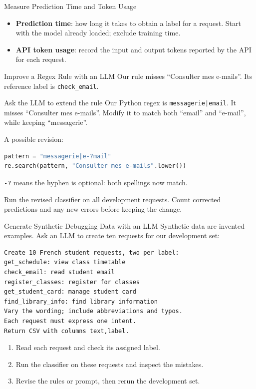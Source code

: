 \documentclass[aspectratio=169]{beamer}
\begin{document}
\begin{frame}{Measure Prediction Time and Token Usage}
  \begin{itemize}
    \item \textbf{Prediction time}: how long it takes to obtain a label for a request. Start with the model already loaded; exclude training time.
    \item \textbf{API token usage}: record the input and output tokens reported by the API for each request.
  \end{itemize}
\end{frame}

\begin{frame}[fragile]{Improve a Regex Rule with an LLM}
  \small Our rule misses ``Consulter mes e-mails''. Its reference label is \texttt{check\_email}.
  \begin{block}{Ask the LLM to extend the rule}
    \small Our Python regex is \texttt{messagerie|email}. It misses ``Consulter mes e-mails''. Modify it to match both ``email'' and ``e-mail'', while keeping ``messagerie''.
  \end{block}
  \small A possible revision:
\begin{lstlisting}[language=Python]
pattern = "messagerie|e-?mail"
re.search(pattern, "Consulter mes e-mails".lower())
\end{lstlisting}
  \small \texttt{-?} means the hyphen is optional: both spellings now match.
  \par\vspace{0.6em}
  Run the revised classifier on all development requests. Count corrected predictions and any new errors before keeping the change.
\end{frame}

\begin{frame}[fragile]{Generate Synthetic Debugging Data with an LLM}
  \small Synthetic data are invented examples. Ask an LLM to create ten requests for our development set:
\begin{lstlisting}
Create 10 French student requests, two per label:
get_schedule: view class timetable
check_email: read student email
register_classes: register for classes
get_student_card: manage student card
find_library_info: find library information
Vary the wording; include abbreviations and typos.
Each request must express one intent.
Return CSV with columns text,label.
\end{lstlisting}
  \begin{enumerate}
    \item Read each request and check its assigned label.
    \item Run the classifier on these requests and inspect the mistakes.
    \item Revise the rules or prompt, then rerun the development set.
  \end{enumerate}
\end{frame}
\end{document}
